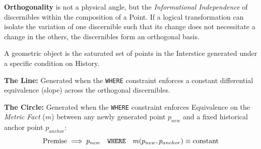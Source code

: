 

\begin{formalism}[Orthogonality]
    \textbf{Orthogonality} is not a physical angle, but the
    \textit{Informational Independence} of discernibles within the
    composition of a Point. If a logical transformation can isolate the
    variation of one discernible such that its change does not necessitate
    a change in the others, the discernibles form an orthogonal basis.
\end{formalism}


\begin{formalism}
    A geometric object is the saturated set of points in the Interstice
    generated under a specific condition on History.

    \textbf{The Line:} Generated when the \texttt{WHERE} constraint enforces
    a constant differential equivalence (slope) across the orthogonal
    discernibles.

    \textbf{The Circle:} Generated when the \texttt{WHERE} constraint
    enforces Equivalence on the \textit{Metric Fact} ($m$) between any newly
    generated point $p_{new}$ and a fixed historical anchor point
    $p_{anchor}$:
    \begin{equation}
        \text{Premise} \implies p_{new} \quad \textnormal{\texttt{WHERE}} \quad m(p_{new}, p_{anchor}) \equiv \text{constant}
    \end{equation}
\end{formalism}

